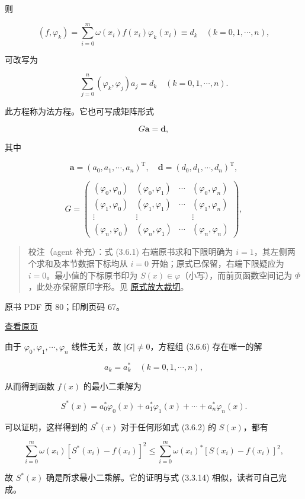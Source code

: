 则

\[
(f,\varphi_k)=\sum_{i=0}^m\omega(x_i)f(x_i)\varphi_k(x_i)\equiv d_k\quad(k=0,1,\cdots,n),
\]

可改写为

\[
\sum_{j=0}^n(\varphi_k,\varphi_j)a_j=d_k\quad(k=0,1,\cdots,n).\tag{3.6.6}
\]

此方程称为法方程。它也可写成矩阵形式

\[
G\boldsymbol a=\boldsymbol d,
\]

其中

\[
\boldsymbol a=(a_0,a_1,\cdots,a_n)^{\mathrm T},\quad\boldsymbol d=(d_0,d_1,\cdots,d_n)^{\mathrm T},
\]

\[
G=\begin{pmatrix}
(\varphi_0,\varphi_0)&(\varphi_0,\varphi_1)&\cdots&(\varphi_0,\varphi_n)\\
(\varphi_1,\varphi_0)&(\varphi_1,\varphi_1)&\cdots&(\varphi_1,\varphi_n)\\
\vdots&\vdots&&\vdots\\
(\varphi_n,\varphi_0)&(\varphi_n,\varphi_1)&\cdots&(\varphi_n,\varphi_n)
\end{pmatrix},\tag{3.6.7}
\]

\begin{quote}
校注（agent 补充）：式 (3.6.1) 右端原书求和下限明确为 \(i=1\)，其左侧两个求和及本节数据下标均从 \(i=0\) 开始；原式已保留，右端下限疑应为 \(i=0\)。最小值的下标原书印为 \(S(x)\in\varphi\)（小写），而前页函数空间记为 \(\Phi\)，此处亦保留原印字形。见 \href{verified/assets/ch03b/p079-minimum-formula.png}{原式放大裁切}。
\end{quote}

\clearpage

原书 PDF 页 80；印刷页码 67。

\href{source-images/pdf-080.jpeg}{查看原页}

由于 \(\varphi_0,\varphi_1,\cdots,\varphi_n\) 线性无关，故 \(|G|\ne0\)，方程组 (3.6.6) 存在唯一的解

\[
a_k=a_k^*\quad(k=0,1,\cdots,n),
\]

从而得到函数 \(f(x)\) 的最小二乘解为

\[
S^*(x)=a_0^*\varphi_0(x)+a_1^*\varphi_1(x)+\cdots+a_n^*\varphi_n(x).
\]

可以证明，这样得到的 \(S^*(x)\) 对于任何形如式 (3.6.2) 的 \(S(x)\)，都有

\[
\sum_{i=0}^m\omega(x_i)[S^*(x_i)-f(x_i)]^2\leqslant\sum_{i=0}^m\omega(x_i)^*[S(x_i)-f(x_i)]^2,
\]

故 \(S^*(x)\) 确是所求最小二乘解。它的证明与式 (3.3.14) 相似，读者可自己完成。

